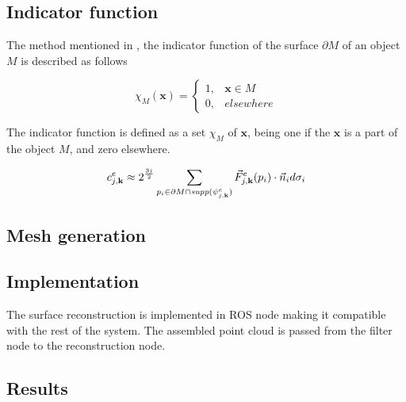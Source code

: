 \subsection{Indicator function}
The method mentioned in \cite{Manson2008}, the indicator function of the surface $\partial M$ of an object $M$ is described as follows

\begin{equation}
	\chi_M(\textbf{x}) = 
	\begin{cases}
	1, & \textbf{x} \in M\\
	0, & elsewhere
	\end{cases} 
	\label{eq:indicator_fnc}
\end{equation}

The indicator function is defined as a set $\chi_M$ of $\textbf{x}$, being one if the $\textbf{x}$ is a part of the object $M$, and zero elsewhere.

\begin{equation}
	c^e_{j,\textbf{k}} \approx 2^{3j \over 2} \sum_{p_i \in \partial M \cap \textit{supp}(\psi^e_{j,\textbf{k}})} \vec{F}^e_{j,\textbf{k}} (p_i) \cdot \vec{n}_i d \sigma_i 
	\label{eq:wavelet_coeffs}
\end{equation}

\subsection{Mesh generation}

\subsection{Implementation}
The surface reconstruction is implemented in ROS node making it compatible with the rest of the system. The assembled point cloud is passed from the filter node to the reconstruction node.

\subsection{Results}